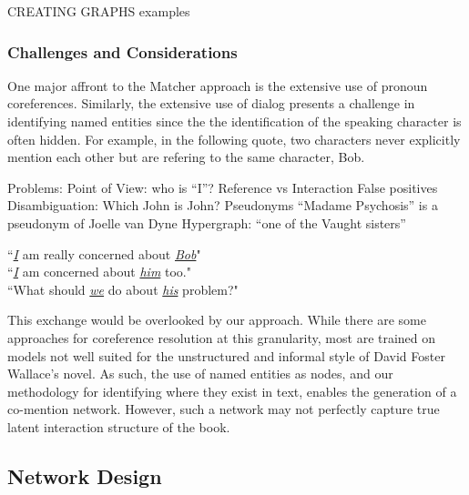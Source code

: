 CREATING GRAPHS examples

\subsubsection{Challenges and Considerations}
One major affront to the Matcher approach is the extensive use of pronoun coreferences. Similarly, the extensive use of dialog presents a challenge in identifying named entities since the the identification of the speaking character is often hidden. For example, in the following quote, two characters never explicitly mention each other but are refering to the same character, Bob.

Problems:
Point of View: who is “I”?
Reference vs Interaction
False positives
Disambiguation: Which John is John?
Pseudonyms
“Madame Psychosis” is a pseudonym of Joelle van Dyne
Hypergraph: “one of the Vaught sisters”

\begin{displayquote}
``\emph{\underline{I}} am really concerned about \emph{\underline{Bob}}"\\
``\emph{\underline{I}} am concerned about \emph{\underline{him}} too."\\
``What should \underline{\emph{we}} do about \underline{\emph{his}} problem?"
\end{displayquote}

This exchange would be overlooked by our approach. While there are some approaches for coreference resolution at this granularity, most are trained on models not well suited for the unstructured and informal style of David Foster Wallace's novel. As such, the use of named entities as nodes, and our methodology for identifying where they exist in text, enables the generation of a co-mention network. However, such a network may not perfectly capture true latent interaction structure of the book.

\subsection{Network Design}

